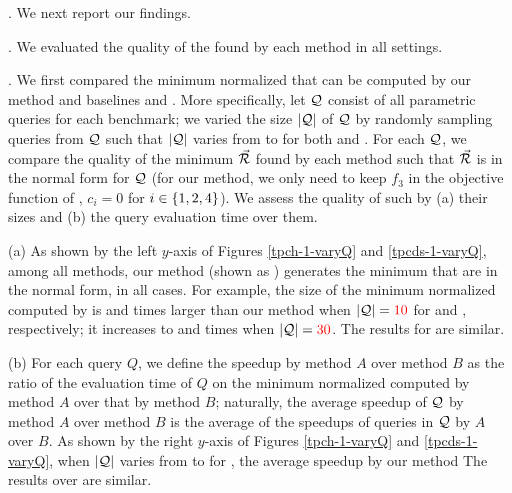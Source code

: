 . We next report our findings.

.
We evaluated the quality of the \bdss found by each method in %
all settings. 


. We first compared the minimum
normalized \bdss that can be computed by our method
and baselines \qcssel and \uscsel.
More specifically, 
let $\mathcal Q$ consist of all parametric queries for each benchmark;
we varied the size $|\mathcal Q|$ of $\mathcal Q$ by randomly sampling queries
from $\mathcal Q$ such that $|\mathcal Q|$ varies from  to  for both \tpch and \tpcds. For each $\mathcal Q$, we compare the quality of
the minimum \bds $\vec{{\mathcal R}}$ found by each method such that
$\vec{{\mathcal R}}$ is in the normal form for $\mathcal Q$ (for our method, we
only need to keep $f_{3}$ in the objective function of \opts,
\ie $c_{i} = 0$ for $i\allowbreak\in\allowbreak \{1,\allowbreak 2,\allowbreak 4\}$).
We assess the quality of such \bdss by (a) their sizes and (b) the
query evaluation time over them.

\sstab (a) As shown by the left $y$-axis of Figures
\ref{tpch-1-varyQ} and \ref{tpcds-1-varyQ}, 
among all methods, our method (shown as \opts)
generates the minimum \bdss that are in the normal
form,
in all cases. For example, the size of the
minimum normalized \bds computed by \warn{\uscsel} is
 and  times larger than our method
when $|\mathcal Q| = {\color{red}{10}}$ for \tpch
and \tpcds, respectively; it increases to  and  times when
$|\mathcal Q| = {\color{red}{30}}$.
The results for \qcssel are similar. %


\sstab (b) For each query $Q$, we define the speedup by method
$A$ over method $B$ as the ratio of the evaluation time of $Q$
on the minimum normalized \bds computed by method $A$ over that
by method $B$; naturally, the average speedup of $\mathcal Q$ by method
$A$ over method $B$ is the average of the speedups of queries in
$\mathcal Q$ by $A$ over $B$.
As shown by the right $y$-axis of Figures \ref{tpch-1-varyQ} and \ref{tpcds-1-varyQ},
when $|\mathcal Q|$ varies from  to  for
\tpcds, the average speedup by our method
The results over \tpch are similar.

